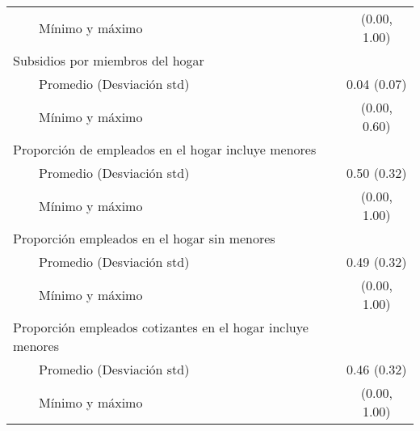 \begin{longtable}{lc}
    Mínimo y máximo & (0.00, 1.00) \\ 
Subsidios por miembros del hogar &  \\ 
    Promedio (Desviación std) & 0.04 (0.07) \\ 
    Mínimo y máximo & (0.00, 0.60) \\ 
Proporción de empleados en el hogar incluye menores &  \\ 
    Promedio (Desviación std) & 0.50 (0.32) \\ 
    Mínimo y máximo & (0.00, 1.00) \\ 
Proporción empleados en el hogar sin menores &  \\ 
    Promedio (Desviación std) & 0.49 (0.32) \\ 
    Mínimo y máximo & (0.00, 1.00) \\ 
Proporción empleados cotizantes en el hogar incluye menores &  \\ 
    Promedio (Desviación std) & 0.46 (0.32) \\ 
    Mínimo y máximo & (0.00, 1.00) \\ 
\bottomrule
\end{longtable}

